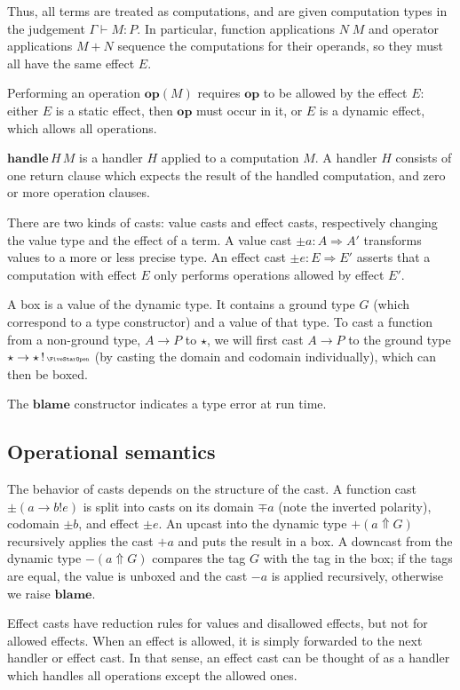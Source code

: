 Thus, all terms are treated as computations, and are given computation types
in the judgement $\Gamma \vdash M : P$.
In particular, function applications $N\;M$ and operator applications $M + N$
sequence the computations for their operands, so they must all have the same
effect $E$.

Performing an operation $\mathbf{op}(M)$ requires $\mathbf{op}$ to be allowed
by the effect $E$: either $E$ is a static effect, then $\mathbf{op}$ must occur
in it, or $E$ is a dynamic effect, which allows all operations.

$\mathbf{handle}\,H\,M$ is a handler $H$ applied to a computation $M$.
A handler $H$ consists of one return clause which expects the result of the
handled computation, and zero or more operation clauses.

There are two kinds of casts: value casts and effect casts, respectively
changing the value type and the effect of a term.
A value cast $\pm a : A \Rightarrow A'$ transforms values to a more or less precise type.
An effect cast $\pm e : E \Rightarrow E'$ asserts that a computation with effect $E$
only performs operations allowed by effect $E'$.

A box is a value of the dynamic type. It contains a ground type $G$
(which correspond to a type constructor) and a value of that type.
To cast a function from a non-ground type, $A \to P$ to $\star$,
we will first cast $A \to P$ to the ground type
$\star \to \star\,!\,\effany$ (by casting the domain and codomain individually),
which can then be boxed.

The $\mathbf{blame}$ constructor indicates a type error at run time.

\subsection{Operational semantics}

The behavior of casts depends on the structure of the cast.
A function cast $\pm (a \to b ! e)$
is split into casts on its domain $\mp a$ (note the inverted polarity), codomain $\pm b$, and effect $\pm e$.
An upcast into the dynamic type $+ (a \Uparrow G)$
recursively applies the cast $+ a$ and puts the result in a box.
A downcast from the dynamic type $- (a \Uparrow G)$ compares
the tag $G$ with the tag in the box; if the tags are equal, the value is
unboxed and the cast $- a$ is applied recursively,
otherwise we raise $\mathbf{blame}$.

Effect casts have reduction rules for values and disallowed effects,
but not for allowed effects. When an effect is allowed, it is simply
forwarded to the next handler or effect cast. In that sense,
an effect cast can be thought of as a handler which handles all operations
except the allowed ones.

